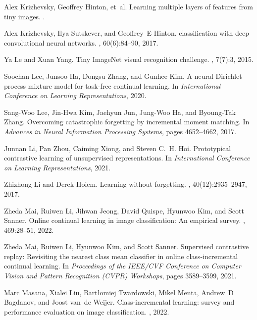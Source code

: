 \documentclass[10pt,twocolumn,letterpaper]{article}
\begin{document}
{\begin{thebibliography}{10}
Alex Krizhevsky, Geoffrey Hinton, et~al.
\newblock Learning multiple layers of features from tiny images.
.

Alex Krizhevsky, Ilya Sutskever, and Geoffrey~E Hinton.
 classification with deep convolutional neural networks.
, 60(6):84--90, 2017.

Ya Le and Xuan Yang.
\newblock Tiny {ImageNet} visual recognition challenge.
, 7(7):3, 2015.

Soochan Lee, Junsoo Ha, Dongsu Zhang, and Gunhee Kim.
\newblock A neural Dirichlet process mixture model for task-free continual
  learning.
\newblock In {\em International Conference on Learning Representations}, 2020.

Sang{-}Woo Lee, Jin{-}Hwa Kim, Jaehyun Jun, Jung{-}Woo Ha, and Byoung{-}Tak
  Zhang.
\newblock Overcoming catastrophic forgetting by incremental moment matching.
\newblock In {\em Advances in Neural Information Processing Systems}, pages
  4652--4662, 2017.

Junnan Li, Pan Zhou, Caiming Xiong, and Steven C.~H. Hoi.
\newblock Prototypical contrastive learning of unsupervised representations.
\newblock In {\em International Conference on Learning Representations}, 2021.

Zhizhong Li and Derek Hoiem.
\newblock Learning without forgetting.
,
  40(12):2935--2947, 2017.

Zheda Mai, Ruiwen Li, Jihwan Jeong, David Quispe, Hyunwoo Kim, and Scott
  Sanner.
\newblock Online continual learning in image classification: An empirical
  survey.
, 469:28--51, 2022.

Zheda Mai, Ruiwen Li, Hyunwoo Kim, and Scott Sanner.
\newblock Supervised contrastive replay: Revisiting the nearest class mean
  classifier in online class-incremental continual learning.
\newblock In {\em Proceedings of the IEEE/CVF Conference on Computer Vision and
  Pattern Recognition (CVPR) Workshops}, pages 3589--3599, 2021.

Marc Masana, Xialei Liu, Bart{\l}omiej Twardowski, Mikel Menta, Andrew~D
  Bagdanov, and Joost van~de Weijer.
\newblock Class-incremental learning: survey and performance evaluation on
  image classification.
,
  2022.


\end{thebibliography}}
\end{document}
